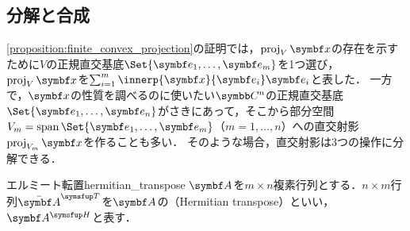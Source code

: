 \documentclass[../../main]{subfiles}
\begin{document}
\subsection{分解と合成}
\label{subsection:analysis_and_synthesis}

\cref{proposition:finite_convex_projection}の証明では，\(\proj_V\vect{x}\)の存在を示すために\(V\)の正規直交基底\(\Set{\vect{e}_1,\dots,\vect{e}_m}\)を1つ選び，\(\proj_V\vect{x}\)を\(\sum_{i=1}^m\innerp{\vect{x}}{\vect{e}_i}\vect{e}_i\)と表した．
一方で，\(\vect{x}\)の性質を調べるのに使いたい\(\numset{C}^n\)の正規直交基底\(\Set{\vect{e}_1,\dots,\vect{e}_n}\)がさきにあって，そこから部分空間\(V_m=\spannedby\Set{\vect{e}_1,\dots,\vect{e}_m}\)（\(m=1,\dots,n\)）への直交射影\(\proj_{V_m}\vect{x}\)を作ることも多い．
そのような場合，直交射影は3つの操作に分解できる．

\begin{definition}{エルミート転置}{hermitian_transpose}
  \(\mat{A}\)を\(m\times n\)複素行列とする．\(n\times m\)行列\(\trps{\conj{\mat{A}}}\)を\(\mat{A}\)の（Hermitian transpose）といい\footnotemark ，\(\htrps{\mat{A}}\)と表す．
\end{definition}
\end{document}
